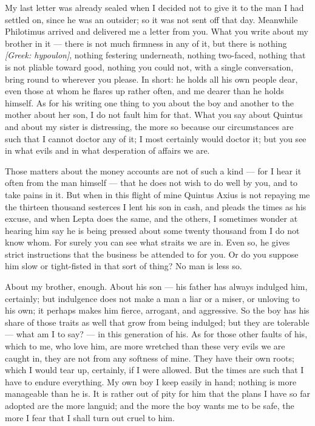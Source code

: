 

 My last letter was already sealed when I decided not to give it to the man I had settled on, since he was an outsider; so it was not sent off that day. Meanwhile Philotimus arrived and delivered me a letter from you. What you write about my brother in it --- there is not much firmness in any of it, but there is nothing \textit{[Greek: hypoulon]}, nothing festering underneath, nothing two-faced, nothing that is not pliable toward good, nothing you could not, with a single conversation, bring round to wherever you please. In short: he holds all his own people dear, even those at whom he flares up rather often, and me dearer than he holds himself. As for his writing one thing to you about the boy and another to the mother about her son, I do not fault him for that. What you say about Quintus and about my sister is distressing, the more so because our circumstances are such that I cannot doctor any of it; I most certainly would doctor it; but you see in what evils and in what desperation of affairs we are.

 Those matters about the money accounts are not of such a kind --- for I hear it often from the man himself --- that he does not wish to do well by you, and to take pains in it. But when in this flight of mine Quintus Axius is not repaying me the thirteen thousand sesterces I lent his son in cash, and pleads the times as his excuse, and when Lepta does the same, and the others, I sometimes wonder at hearing him say he is being pressed about some twenty thousand from I do not know whom. For surely you can see what straits we are in. Even so, he gives strict instructions that the business be attended to for you. Or do you suppose him slow or tight-fisted in that sort of thing? No man is less so.

 About my brother, enough. About his son --- his father has always indulged him, certainly; but indulgence does not make a man a liar or a miser, or unloving to his own; it perhaps makes him fierce, arrogant, and aggressive. So the boy has his share of those traits as well that grow from being indulged; but they are tolerable --- what am I to say? --- in this generation of his. As for those other faults of his, which to me, who love him, are more wretched than these very evils we are caught in, they are not from any softness of mine. They have their own roots; which I would tear up, certainly, if I were allowed. But the times are such that I have to endure everything. My own boy I keep easily in hand; nothing is more manageable than he is. It is rather out of pity for him that the plans I have so far adopted are the more languid; and the more the boy wants me to be safe, the more I fear that I shall turn out cruel to him.


